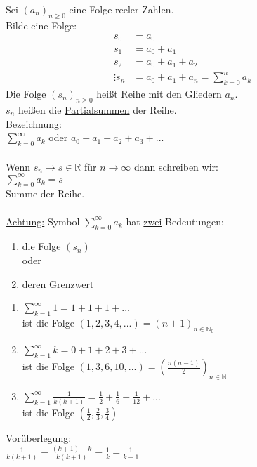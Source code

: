 Sei $(a_n)_{n \geq 0}$ eine Folge reeler Zahlen.\\
Bilde eine Folge:
\begin{align*}
s_0 &= a_0\\
s_1 &= a_0 + a_1\\
s_2 &= a_0 + a_1 + a_2\\
\vdots
s_n &= a_0 + a_1 + a_n = \sum\limits_{k = 0}^{n} a_k
\end{align*}
Die Folge $(s_n)_{n \geq 0}$ heißt Reihe mit den Gliedern $a_n$.\\
$s_n$ heißen die \underline{Partialsummen} der Reihe.\\
Bezeichnung:\\
$\sum\limits_{k = 0}^{\infty} a_k$ oder $a_0 + a_1 + a_2 + a_3 + ...$\\ \\
Wenn $s_n \to s \in \mathbb{R}$ für $n \to \infty$ dann schreiben wir:\\
$\sum\limits_{k = 0}^{\infty} a_k = s$\\
Summe der Reihe.\\
\\
\underline{Achtung:} Symbol $\sum\limits_{k = 0}^{\infty} a_k$ hat \underline{zwei} Bedeutungen:
\begin{enumerate}
\item{die Folge $(s_n)$} \\
oder 
\item{deren Grenzwert}
\end{enumerate}
\bsp
\begin{enumerate}
\item{$\sum\limits_{k = 1}^{\infty} 1 = 1+1+1+...$\\
ist die Folge $(1, 2, 3, 4,...) = (n + 1)_{n \in \mathbb{N}_{0}}$}
\item{$\sum\limits_{k = 1}^{\infty} k = 0 + 1 + 2 + 3+ ...$ \\
ist die Folge $(1, 3, 6, 10,...) = (\displaystyle\frac{n(n - 1)}{2})_{n \in \mathbb{N}}$ }
\item{$\sum\limits_{k = 1}^{\infty} \displaystyle\frac{1}{k(k+1)} = \displaystyle\frac{1}{2} + \displaystyle\frac{1}{6} + \displaystyle\frac{1}{12} + ...$\\
ist die Folge $(\displaystyle\frac{1}{2}, \displaystyle\frac{2}{3}, \displaystyle\frac{3}{4})$}
\end{enumerate}
\vspace{5mm}
Vorüberlegung:\\
$\displaystyle\frac{1}{k(k+1)} = \displaystyle\frac{(k+1) - k}{k(k+1)} = \frac{1}{k} - \displaystyle\frac{1}{k + 1}$\\ \\

